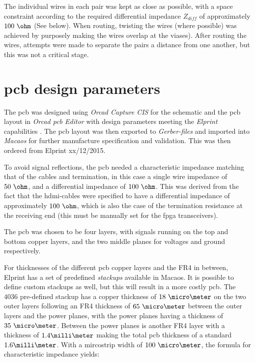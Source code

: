 \documentclass[main.tex]{subfiles}
\begin{document}
The individual wires in each pair was kept as close as possible, with a space constraint according to the required differential impedance $Z_{diff}$ of approximately $100\ \ohm$ (See below). When routing, twisting the wires (where possible) was achieved by purposely making the wires overlap at the viases). After routing the wires, attempts were made to separate the pairs a distance from one another, but this was not a critical stage.

\section{\gls{pcb} design parameters}

The \gls{pcb} was designed using \textit{Orcad Capture CIS} for the schematic and the \gls{pcb} layout in \textit{Orcad \gls{pcb} Editor} with design parameters meeting the \textit{Elprint} capabilities \cite{elprint15}. The \gls{pcb} layout was then exported to \textit{Gerber-files} and imported into \textit{Macaos} for further manufacture specification and validation. This was then ordered from Elprint xx/12/2015.

To avoid signal reflections, the \gls{pcb} needed a characteristic impedance matching that of the cables and termination, in this case a single wire impedance of $50\ \ohm$, and a differential impedance of $100\ \ohm$. This was derived from the fact that the \gls{hdmi}-cables were specified to have a differential impedance of approximately $100\ \ohm$, which is also the case of the termination resistance at the receiving end (this must be manually set for the \gls{fpga} transceivers).

The \gls{pcb} was chosen to be four layers, with signals running on the top and bottom copper layers, and the two middle planes for voltages and ground respectively.

For thicknesses of the different \gls{pcb} copper layers and the FR4 in between, Elprint has a set of predefined \textit{stackups} available in Macaos. It is possible to define custom stackups as well, but this will result in a more costly \gls{pcb}. The $4036$ pre-defined stackup has a copper thickness of $18\ \micro\meter$ on the two outer layers following an FR4 thickness of $65\ \micro\meter$ between the outer layers and the power planes, with the power planes having a thickness of $35\ \micro\meter$. Between the power planes is another FR4 layer with a thickness of $1.4 \milli\meter$ making the total \gls{pcb} thickness of a standard $1.6 \milli\meter$. With a mircostrip width of $100\ \micro\meter$, the formula for characteristic impedance yields:
\end{document}
